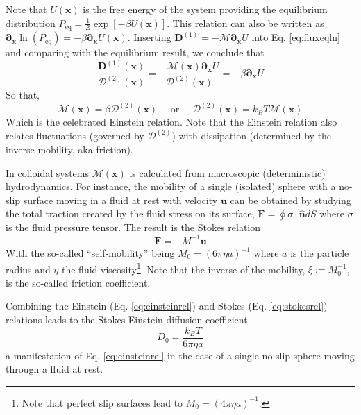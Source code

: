 \documentclass[twoside,openright,titlepage,numbers=noenddot,%
headinclude,footinclude,cleardoublepage=empty,abstract=on,
BCOR=5mm,fontsize=11pt, dvipsnames, paper=b5
]{scrreprt}
\renewcommand{\vec}[1]{\bm{#1}}
\newcommand{\tens}[1]{\bm{\mathcal{#1}}}
\newcommand{\kT}{k_B T}
\newcommand{\pvel}{u}
\begin{document}
Note that $U(\vec{x})$ is the free energy of the system providing the equilibrium distribution $P_{\text{eq}} = \frac{1}{Z}\exp\left[-\beta U(\vec{x})\right]$. This relation can also be written as $\vec{\partial}_{\vec{x}}\ln\left(P_{\text{eq}}\right) = -\beta \vec{\partial}_{\vec{x}} U(\vec{x})$. Inserting $\vec{D}^{(1)} = -\tens{M}\vec{\partial}_{\vec{x}}U$ into Eq. \eqref{eq:fluxeqln} and comparing with the equilibrium result, we conclude that
\begin{equation}
  \frac{\vec{D}^{(1)}(\vec{x})}{\tens{D}^{(2)}(\vec{x})} = \frac{-\tens{M}(\vec{x})\vec{\partial}_{\vec{x}}U}{\tens{D}^{(2)}(\vec{x})} = -\beta\vec{\partial}_{\vec{x}}U
\end{equation}
So that,
\begin{equation}
  \label{eq:einsteinrel}
  \tens{M}(\vec{x}) = \beta\tens{D}^{(2)}(\vec{x})\quad\text{ or }\quad\tens{D}^{(2)}(\vec{x}) = \kT\tens{M}(\vec{x})
\end{equation}
Which is the celebrated Einstein relation. Note that the Einstein relation also relates fluctuations (governed by $\tens{D}^{(2)}$) with dissipation (determined by the inverse mobility, aka friction).

In colloidal systems $\tens{M}(\vec{x})$ is calculated from macroscopic (deterministic) hydrodynamics. For instance, the mobility of a single (isolated) sphere with a no-slip surface moving in a fluid at rest with velocity $\vec{\pvel}$ can be obtained \cite{Dhont1996} by studying the total traction created by the fluid stress on its surface, $\vec{F} = \oint\tens{\sigma}\cdot \hat{\vec{n}}dS$ where $\tens{\sigma}$ is the fluid pressure tensor. The result is the Stokes relation
\begin{equation}
  \label{eq:stokesrel}
  \vec{F} = -M_0^{-1} \vec{\pvel}
\end{equation}
With the so-called ``self-mobility'' being $M_0 = \left(6\pi\eta a\right)^{-1}$ where $a$ is the particle radius and $\eta$ the fluid viscosity\footnote{Note that perfect slip surfaces lead to $M_0 = (4\pi\eta a)^{-1}$.}. Note that the inverse of the mobility, $\xi := M_0^{-1}$, is the so-called friction coefficient.

Combining the Einstein (Eq. \eqref{eq:einsteinrel}) and Stokes (Eq. \eqref{eq:stokesrel}) relations leads to the Stokes-Einstein diffusion coefficient
\begin{equation}
  \label{eq:spherediff}
  D_0 = \frac{\kT}{6\pi\eta a}
\end{equation}
a manifestation of Eq. \eqref{eq:einsteinrel} in the case of a single no-slip sphere moving through a fluid at rest.
\end{document}
